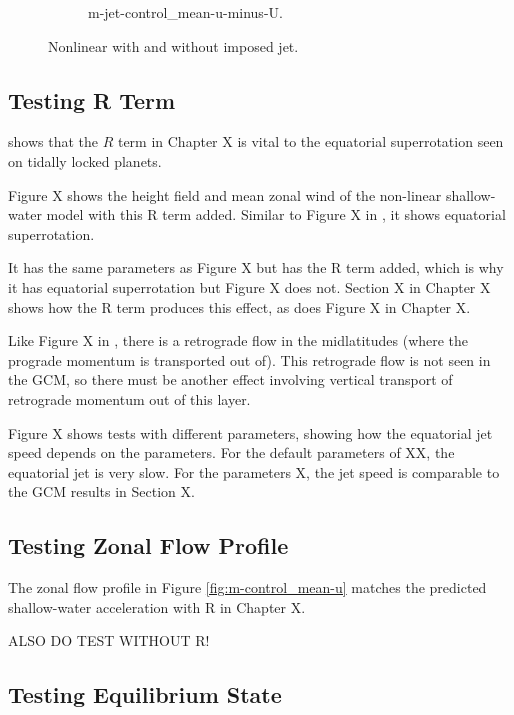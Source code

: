\begin{figure}
\begin{subfigure}[b]{0.33\textwidth}
    \caption{m-jet-control_mean-u-minus-U.}
    \label{fig:m-jet-control_mean-u-minus-U}
  \end{subfigure}
  \caption{Nonlinear with and without imposed jet.}
  \label{fig:m-jet-control_mean-u_figure}
\end{figure}

\subsection*{Testing R Term}

\citet{showman2010superrotation} shows that the $R$ term in Chapter X is vital to the equatorial superrotation seen on tidally locked planets.

Figure X shows the height field and mean zonal wind of the non-linear shallow-water model with this R term added. Similar to Figure X in \citet{showman2010superrotation}, it shows equatorial superrotation.

It has the same parameters as Figure X but has the R term added, which is why it has equatorial superrotation but Figure X does not. Section X in Chapter X shows how the R term produces this effect, as does Figure X in Chapter X.

Like Figure X in \citet{showman2010superrotation}, there is a retrograde flow in the midlatitudes (where the prograde momentum is transported out of). This retrograde flow is not seen in the GCM, so there must be another effect involving vertical transport of retrograde momentum out of this layer.

Figure X shows tests with different parameters, showing how the equatorial jet speed depends on the parameters. For the default parameters of XX, the equatorial jet is very slow. For the parameters X, the jet speed is comparable to the GCM results in Section X.


\subsection*{Testing Zonal Flow Profile}

The zonal flow profile in Figure \ref{fig:m-control_mean-u} matches the predicted shallow-water acceleration with R in Chapter X.

ALSO DO TEST WITHOUT R!



\subsection*{Testing Equilibrium State}


